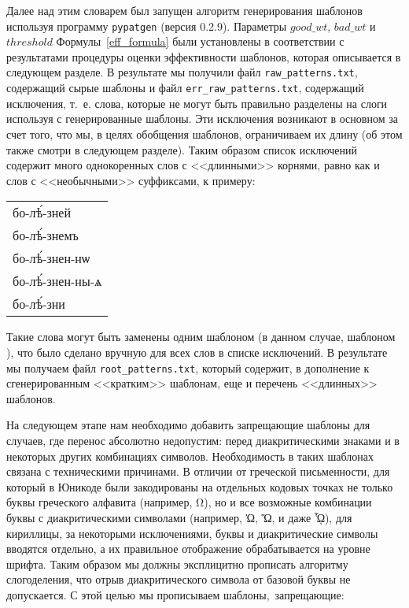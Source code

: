 \documentclass[12pt,a4paper,oneside]{extarticle}
\begin{document}
Далее над этим словарем был запущен алгоритм генерирования шаблонов используя программу \verb+pypatgen+ (версия 0.2.9). Параметры 
$good\_wt$, $bad\_wt$ и $threshold$ Формулы~\ref{eff_formula} были установлены в соответствии с результатами процедуры оценки эффективности 
шаблонов, которая описывается в следующем разделе. В результате мы получили файл \verb+raw_patterns.txt+, содержащий сырые шаблоны и 
файл \verb+err_raw_patterns.txt+, содержащий исключения, т.~е. слова, которые не могут быть правильно разделены на слоги используя с
генерированные шаблоны. Эти исключения возникают в основном за счет того, что мы, в целях обобщения шаблонов, ограничиваем их длину (об этом 
также смотри в следующем разделе). Таким образом список исключений содержит много однокоренных слов с <<длинными>> корнями, равно как и 
слов с <<необычными>> суффиксами, к примеру:

\begin{center}
\begin{churchslavonic}
\begin{tabular}{l}
бо-лѣ́-зней \\
бо-лѣ́-знемъ \\
бо-лѣ́-знен-нѡ \\
бо-лѣ́-знен-ны-ѧ \\
бо-лѣ́-зни \\
\end{tabular}
\end{churchslavonic}
\end{center}

Такие слова могут быть заменены одним шаблоном (в данном случае, шаблоном ), что было сделано вручную для всех 
слов в списке исключений. В результате мы получаем файл \verb+root_patterns.txt+, который содержит, в дополнение к сгенерированным 
<<кратким>> шаблонам, еще и перечень <<длинных>> шаблонов.

На следующем этапе нам необходимо добавить запрещающие шаблоны для случаев, где перенос абсолютно недопустим: перед диакритическими знаками 
и в некоторых других комбинациях символов. Необходимость в таких шаблонах связана с техническими причинами. В отличии от греческой 
письменности, для который в Юникоде были закодированы на отдельных кодовых точках не только буквы греческого алфавита (например, 
\textgreek{Ω}), но и все возможные комбинации буквы с диакритическими символами (например, \textgreek{Ὠ}, \textgreek{Ὥ}, и даже 
\textgreek{ᾯ}), для кириллицы, за некоторыми исключениями, буквы и диакритические символы вводятся отдельно, а их правильное отображение 
обрабатывается на уровне шрифта. Таким образом мы должны эксплицитно прописать алгоритму слогоделения, что отрыв диакритического символа от 
базовой буквы не допускается. С этой целью мы прописываем шаблоны, запрещающие:
\end{document}
